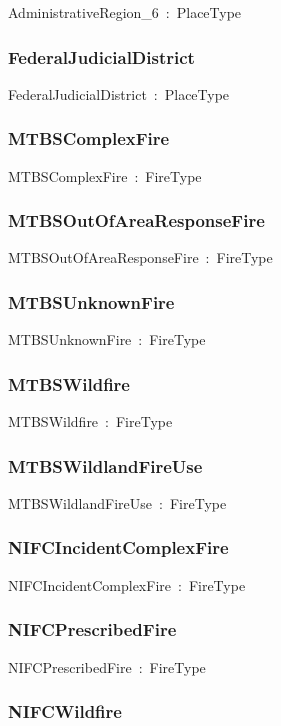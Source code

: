 \documentclass{article}
\begin{document}
AdministrativeRegion\_6~:~PlaceType

\subsubsection*{FederalJudicialDistrict}

FederalJudicialDistrict~:~PlaceType

\subsubsection*{MTBSComplexFire}

MTBSComplexFire~:~FireType

\subsubsection*{MTBSOutOfAreaResponseFire}

MTBSOutOfAreaResponseFire~:~FireType

\subsubsection*{MTBSUnknownFire}

MTBSUnknownFire~:~FireType

\subsubsection*{MTBSWildfire}

MTBSWildfire~:~FireType

\subsubsection*{MTBSWildlandFireUse}

MTBSWildlandFireUse~:~FireType

\subsubsection*{NIFCIncidentComplexFire}

NIFCIncidentComplexFire~:~FireType

\subsubsection*{NIFCPrescribedFire}

NIFCPrescribedFire~:~FireType

\subsubsection*{NIFCWildfire}
\end{document}
